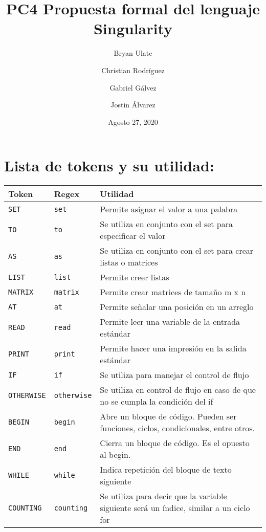 \documentclass[titlepage]{article}
\title{PC4 Propuesta formal del lenguaje Singularity}
\author[1]{Bryan Ulate}
\author[1]{Christian Rodríguez}
\author[1]{Gabriel Gálvez}
\author[1]{Jostin Álvarez}
\affil[1]{Quantum Refraction}
\date{Agosto 27, 2020}
\begin{document}
\maketitle

\section{Lista de tokens y su utilidad: }
    \begin{longtable}{p{}p{}p{}}
        \toprule
        \textbf{Token} & \textbf{Regex} & \textbf{Utilidad} \\
        \midrule
            \texttt{SET} & \texttt{set} & Permite asignar el valor a una palabra \\
            \texttt{TO} & \texttt{to} &  Se utiliza en conjunto con el set para especificar el valor\\
            \texttt{AS} & \texttt{as} & Se utiliza en conjunto con el set para crear listas o matrices\\
            \texttt{LIST} & \texttt{list} & Permite creer listas\\
            \texttt{MATRIX} & \texttt{matrix} & Permite crear matrices de tamaño m x n\\
            \texttt{AT} & \texttt{at} & Permite señalar una posición en un arreglo\\
            \texttt{READ} & \texttt{read} & Permite leer una variable de la entrada estándar \\
            \texttt{PRINT} & \texttt{print} & Permite hacer una impresión en la salida estándar\\
            \texttt{IF} & \texttt{if} & Se utiliza para manejar el control de flujo\\
            \texttt{OTHERWISE} & \texttt{otherwise} & Se utiliza en control de flujo en caso de que no se cumpla la condición del if\\
            \texttt{BEGIN} & \texttt{begin} & Abre un bloque de código. Pueden ser funciones, ciclos, condicionales, entre otros. \\
            \texttt{END} & \texttt{end} & Cierra un bloque de código. Es el opuesto al begin.\\
            \texttt{WHILE} & \texttt{while} & Indica repetición del bloque de texto siguiente\\
            \texttt{COUNTING} & \texttt{counting} & Se utiliza para decir que la variable siguiente será un índice, similar a un ciclo for \\

\end{longtable}
\end{document}
